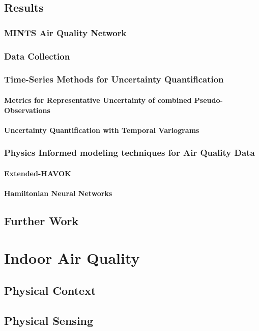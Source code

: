 \documentclass[doublespacing]{utdthesis}
\begin{document}
\section{Results}
\subsection{MINTS Air Quality Network}
\subsection{Data Collection }
\subsection{Time-Series Methods for Uncertainty Quantification}
\subsubsection{Metrics for Representative Uncertainty of combined Pseudo-Observations}
\subsubsection{Uncertainty Quantification with Temporal Variograms}
\subsection{Physics Informed modeling techniques for Air Quality Data}
\subsubsection{Extended-HAVOK}
\subsubsection{Hamiltonian Neural Networks}
\section{Further Work}

\chapter{Indoor Air Quality}
\section{Physical Context}
\section{Physical Sensing}
\end{document}
